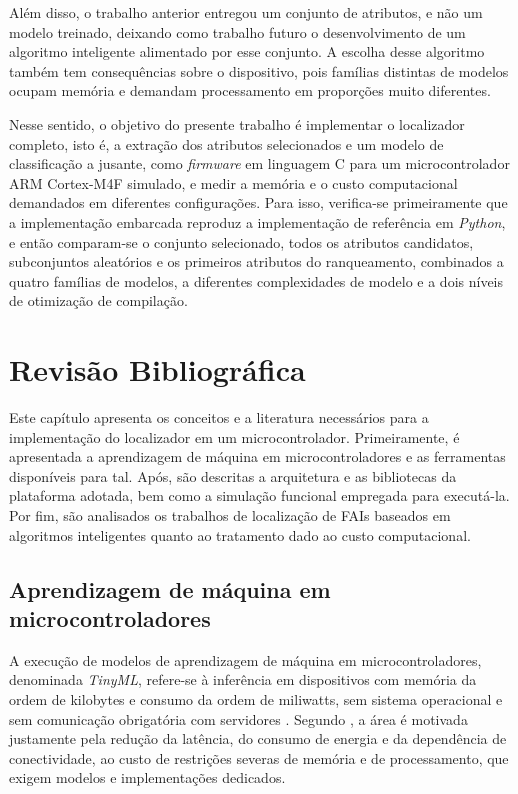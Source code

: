 \documentclass[
	12pt,				%
	openright,			%
	oneside,			%
	a4paper,			%
	english,			%
	brazil,				%
	]{abntex2}
\begin{document}
Além disso, o trabalho anterior entregou um conjunto de atributos, e não um modelo treinado, deixando como trabalho futuro o desenvolvimento de um algoritmo inteligente alimentado por esse conjunto. A escolha desse algoritmo também tem consequências sobre o dispositivo, pois famílias distintas de modelos ocupam memória e demandam processamento em proporções muito diferentes.

Nesse sentido, o objetivo do presente trabalho é implementar o localizador completo, isto é, a extração dos atributos selecionados e um modelo de classificação a jusante, como \textit{firmware} em linguagem C para um microcontrolador ARM Cortex-M4F simulado, e medir a memória e o custo computacional demandados em diferentes configurações. Para isso, verifica-se primeiramente que a implementação embarcada reproduz a implementação de referência em \textit{Python}, e então comparam-se o conjunto selecionado, todos os atributos candidatos, subconjuntos aleatórios e os primeiros atributos do ranqueamento, combinados a quatro famílias de modelos, a diferentes complexidades de modelo e a dois níveis de otimização de compilação.

\chapter{Revisão Bibliográfica}
\label{cap:revisao}
Este capítulo apresenta os conceitos e a literatura necessários para a implementação do localizador em um microcontrolador. Primeiramente, é apresentada a aprendizagem de máquina em microcontroladores e as ferramentas disponíveis para tal. Após, são descritas a arquitetura e as bibliotecas da plataforma adotada, bem como a simulação funcional empregada para executá-la. Por fim, são analisados os trabalhos de localização de FAIs baseados em algoritmos inteligentes quanto ao tratamento dado ao custo computacional.

\section{Aprendizagem de máquina em microcontroladores}
A execução de modelos de aprendizagem de máquina em microcontroladores, denominada \textit{TinyML}, refere-se à inferência em dispositivos com memória da ordem de kilobytes e consumo da ordem de miliwatts, sem sistema operacional e sem comunicação obrigatória com servidores \cite{warden_tinyml}. Segundo , a área é motivada justamente pela redução da latência, do consumo de energia e da dependência de conectividade, ao custo de restrições severas de memória e de processamento, que exigem modelos e implementações dedicados.
\end{document}
